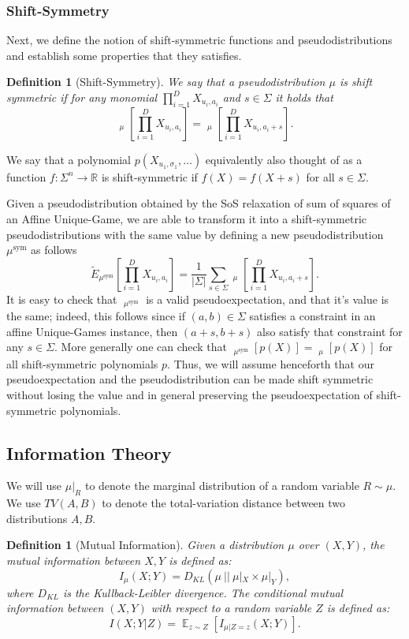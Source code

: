 \documentclass[11pt]{article}
\DeclareMathOperator*{\E}{\mathbb{E}}
\DeclareMathOperator*{\pE}{\widetilde{\mathbb{E}}}
\def \R {\mathbb{R}}
\def \sos {SoS\xspace}
\newtheorem{definition}[theorem]{Definition}
\theoremstyle{definition}
\begin{document}
\subsubsection{Shift-Symmetry}\label{sec:symm-prelims}
Next, we define the notion of shift-symmetric functions and pseudodistributions and establish some properties that they
satisfies.
\begin{definition}[Shift-Symmetry]\label{def:shift-symm}
We say that a pseudodistribution $\mu$ is shift symmetric if 
for any monomial $\prod\limits_{i=1}^{D} X_{u_i, a_i}$ and $s\in\Sigma$ it holds that
\[
\pE_{\mu}\left[\prod\limits_{i=1}^{D} X_{u_i, a_i}\right]
=
\pE_{\mu}\left[\prod\limits_{i=1}^{D} X_{u_i, a_i+s}\right].
\]
\end{definition}
We say that a polynomial $p(X_{u_1,\sigma_1},\ldots)$ equivalently also thought of as a function $f: \Sigma^n \rightarrow \R$ is shift-symmetric if $f(X) = f(X+s)$ for all $s \in \Sigma$.

Given a pseudodistribution obtained by the \sos relaxation of sum of squares of an 
Affine Unique-Game, we are able to 
transform it into a shift-symmetric pseudodistributions 
with the same value by defining a new pseudodistribution $\mu^{\text{sym}}$ as follows
\[
\widetilde{E}_{\mu^{\text{sym}}}\left[\prod\limits_{i=1}^{D} X_{u_i, a_i}\right] 
= 
\frac{1}{|\Sigma|}\sum\limits_{s\in\Sigma}
\pE_{\mu}\left[\prod\limits_{i=1}^{D} X_{u_i, a_i+s}\right].
\]
It is easy to check that $\pE_{\mu^{\text{sym}}}$ is a valid pseudoexpectation, 
and that it's value is the same; indeed, this follows since if $(a,b)\in \Sigma$ satisfies a constraint in an affine Unique-Games instance, then $(a+s,b+s)$ also satisfy that 
constraint for any $s\in\Sigma$. More generally one can check that $\pE_{\mu^{\text{sym}}}[p(X)] = \pE_{\mu}[p(X)]$ for all shift-symmetric polynomials $p$.
Thus, we will assume henceforth that our pseudoexpectation and the pseudodistribution can be made shift symmetric without losing the value and in general preserving the pseudoexpectation of shift-symmetric polynomials. 



\subsection{Information Theory}
We will use $\mu|_R$ to denote the marginal distribution of a random variable $R \sim \mu$. We use $TV(A,B)$ to denote the total-variation distance between two distributions $A,B$.

\begin{definition}[Mutual Information]
Given a distribution $\mu$ over $(X,Y)$, the mutual information between $X,Y$ is defined as:
\[I_\mu(X;Y) = D_{KL}(\mu~ || ~\mu|_X \times \mu|_Y),\]
where $D_{KL}$ is the Kullback-Leibler divergence. The conditional mutual information between $(X,Y)$ with respect to a random variable $Z$ is defined as:
\[I(X;Y | Z) = \E_{z \sim Z}[I_{\mu | Z = z}(X;Y)].\]
\end{definition}
\end{document}
